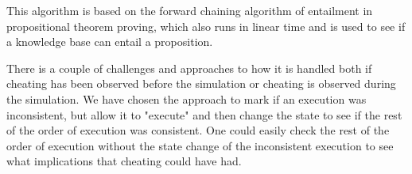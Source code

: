 	\newpar This algorithm is based on the forward chaining algorithm of entailment in propositional theorem proving, which also runs in linear time and is used to see if a knowledge base can entail a proposition.
	
    \newpar There is a couple of challenges and approaches to how it is handled both if cheating has been observed before the simulation or cheating is observed during the simulation. We have chosen the approach to mark if an execution was inconsistent, but allow it to "execute" and then change the state to see if the rest of the order of execution was consistent. One could easily check the rest of the order of execution without the state change of the inconsistent execution to see what implications that cheating could have had.